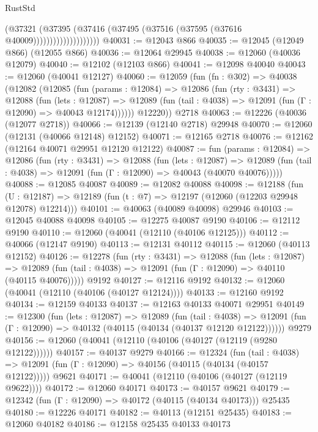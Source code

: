 \begin{lexlean}{RustStd}
\begin{coremodule}
                              (@37321
                                (@37395
                                  (@37416 (@37495 (@37516 (@37595 (@37616 @40009))))))))))))))))))))
@40031 := @12043 @866
@40035 := @12045 (@12049 @866) (@12055 @866)
@40036 := @12064 @29945
@40038 := @12060 (@40036 @12079)
@40040 := @12102 (@12103 @866)
@40041 := @12098 @40040
@40043 := @12060 (@40041 @12127)
@40060 := @12059
    (fun (fn : @302) =>
    @40038
      (@12082
        (@12085
          (fun (params : @12084) =>
          @12086
            (fun (rty : @3431) =>
            @12088
              (fun (lets : @12087) =>
              @12089 (fun (tail : @4038) => @12091 (fun (Γ : @12090) => @40043 @12174))))))
        @12220))
    @2718
@40063 := @12226 (@40036 (@12077 @2718))
@40066 := @12139 (@12140 @2718) @29948
@40070 := @12060 (@12131 (@40066 @12148) @12152)
@40071 := @12165 @2718
@40076 := @12162 (@12164 @40071 @29951 @12120 @12122)
@40087 := fun (params : @12084) =>
  @12086
    (fun (rty : @3431) =>
    @12088
      (fun (lets : @12087) =>
      @12089 (fun (tail : @4038) => @12091 (fun (Γ : @12090) => @40043 (@40070 @40076)))))
@40088 := @12085 @40087
@40089 := @12082 @40088
@40098 := @12188
    (fun (U : @12187) => @12189 (fun (t : @7) => @12197 (@12060 (@12203 @29948 @12078) @12214)))
@40101 := @40063 (@40089 @40098) @29946
@40103 := @12045 @40088 @40098
@40105 := @12275 @40087 @9190
@40106 := @12112 @9190
@40110 := @12060 (@40041 (@12110 (@40106 @12125)))
@40112 := @40066 (@12147 @9190)
@40113 := @12131 @40112
@40115 := @12060 (@40113 @12152)
@40126 := @12278
    (fun (rty : @3431) =>
    @12088
      (fun (lets : @12087) =>
      @12089 (fun (tail : @4038) => @12091 (fun (Γ : @12090) => @40110 (@40115 @40076)))))
    @9192
@40127 := @12116 @9192
@40132 := @12060 (@40041 (@12110 (@40106 (@40127 @12124))))
@40133 := @12160 @9192
@40134 := @12159 @40133
@40137 := @12163 @40133 @40071 @29951
@40149 := @12300
    (fun (lets : @12087) =>
    @12089
      (fun (tail : @4038) =>
      @12091 (fun (Γ : @12090) => @40132 (@40115 (@40134 (@40137 @12120 @12122))))))
    @9279
@40156 := @12060 (@40041 (@12110 (@40106 (@40127 (@12119 (@9280 @12122))))))
@40157 := @40137 @9279
@40166 := @12324
    (fun (tail : @4038) => @12091 (fun (Γ : @12090) => @40156 (@40115 (@40134 (@40157 @12122)))))
    @9621
@40171 := @40041 (@12110 (@40106 (@40127 (@12119 @9622))))
@40172 := @12060 @40171
@40173 := @40157 @9621
@40179 := @12342 (fun (Γ : @12090) => @40172 (@40115 (@40134 @40173))) @25435
@40180 := @12226 @40171
@40182 := @40113 (@12151 @25435)
@40183 := @12060 @40182
@40186 := @12158 @25435 @40133 @40173

\end{coremodule}
\end{lexlean}
